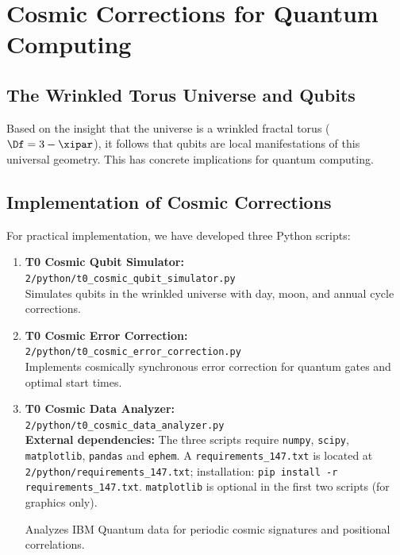 \section{Cosmic Corrections for Quantum Computing}
\label{sec:cosmic_corrections}

\subsection{The Wrinkled Torus Universe and Qubits}

Based on the insight that the universe is a wrinkled fractal torus
($\Df = 3 - \xipar$), it follows that qubits are local manifestations of this
universal geometry. This has concrete implications for quantum computing.

\subsection{Implementation of Cosmic Corrections}

For practical implementation, we have developed three Python scripts:

\begin{enumerate}
	\item \textbf{T0 Cosmic Qubit Simulator:} \\
	\texttt{2/python/t0\_cosmic\_qubit\_simulator.py} \\
	Simulates qubits in the wrinkled universe with day, moon, and annual cycle corrections.
	
	\item \textbf{T0 Cosmic Error Correction:} \\
	\texttt{2/python/t0\_cosmic\_error\_correction.py} \\
	Implements cosmically synchronous error correction for quantum gates and optimal start times.
	
	\item \textbf{T0 Cosmic Data Analyzer:} \\
	\texttt{2/python/t0\_cosmic\_data\_analyzer.py} \\

\smallskip
\textbf{External dependencies:} The three scripts require
\texttt{numpy}, \texttt{scipy}, \texttt{matplotlib},
\texttt{pandas} and \texttt{ephem}. A
\texttt{requirements\_147.txt} is located at
\texttt{2/python/requirements\_147.txt};
installation: \texttt{pip install -r requirements\_147.txt}.
\texttt{matplotlib} is optional in the first two scripts
(for graphics only).

	Analyzes IBM Quantum data for periodic cosmic signatures and positional correlations.
\end{enumerate}

